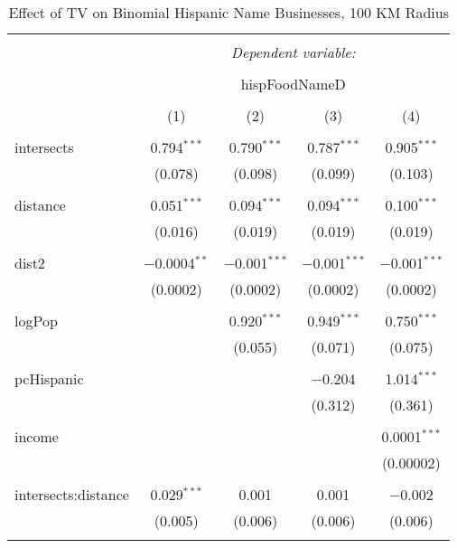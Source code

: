 
\begin{table}[!htbp] \centering 
  \caption{Effect of TV on Binomial Hispanic Name Businesses, 100 KM Radius} 
  \label{} 
\begin{tabular}{@{\extracolsep{-5pt}}lcccc} 
\\[-1.8ex]\hline 
\hline \\[-1.8ex] 
 & \multicolumn{4}{c}{\textit{Dependent variable:}} \\ 
\cline{2-5} 
\\[-1.8ex] & \multicolumn{4}{c}{hispFoodNameD} \\ 
\\[-1.8ex] & (1) & (2) & (3) & (4)\\ 
\hline \\[-1.8ex] 
 intersects & 0.794$^{***}$ & 0.790$^{***}$ & 0.787$^{***}$ & 0.905$^{***}$ \\ 
  & (0.078) & (0.098) & (0.099) & (0.103) \\ 
  & & & & \\ 
 distance & 0.051$^{***}$ & 0.094$^{***}$ & 0.094$^{***}$ & 0.100$^{***}$ \\ 
  & (0.016) & (0.019) & (0.019) & (0.019) \\ 
  & & & & \\ 
 dist2 & $-$0.0004$^{**}$ & $-$0.001$^{***}$ & $-$0.001$^{***}$ & $-$0.001$^{***}$ \\ 
  & (0.0002) & (0.0002) & (0.0002) & (0.0002) \\ 
  & & & & \\ 
 logPop &  & 0.920$^{***}$ & 0.949$^{***}$ & 0.750$^{***}$ \\ 
  &  & (0.055) & (0.071) & (0.075) \\ 
  & & & & \\ 
 pcHispanic &  &  & $-$0.204 & 1.014$^{***}$ \\ 
  &  &  & (0.312) & (0.361) \\ 
  & & & & \\ 
 income &  &  &  & 0.0001$^{***}$ \\ 
  &  &  &  & (0.00002) \\ 
  & & & & \\ 
 intersects:distance & 0.029$^{***}$ & 0.001 & 0.001 & $-$0.002 \\ 
  & (0.005) & (0.006) & (0.006) & (0.006) \\ 
  & & & & \\ 

\end{tabular}
\end{table}
